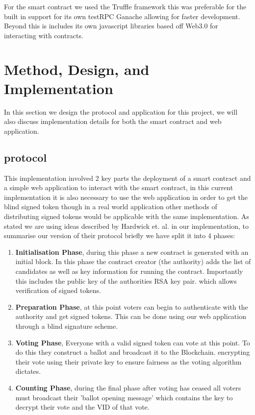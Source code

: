 \documentclass{entcs}
\begin{document}
For the smart contract we used the Truffle framework this was preferable for the built in support for its own testRPC Ganache allowing for faster development. Beyond this is includes its own javascript libraries based off Web3.0 for interacting with contracts.

\section{Method, Design, and Implementation}
In this section we design the protocol and application for this project, we will also discuss implementation details for both the smart contract and web application.

\subsection{protocol}
This implementation involved 2 key parts the deployment of a smart contract and a simple web application to interact with the smart contract, in this current implementation it is also necessary to use the web application in order to get the blind signed token though in a real world application other methods of distributing signed tokens would be applicable with the same implementation.
As stated we are using ideas described by Hardwick et. al. \cite{hardwick2018} in our implementation, to summarise our version of their protocol briefly we have split it into 4 phases:
\begin{enumerate}
    \item \textbf{Initialisation Phase}, during this phase a new contract is generated with an initial block. In this phase the contract creator (the authority) adds the list of candidates as well as key information for running the contract. Importantly this includes the public key of the authorities RSA key pair. which allows verification of signed tokens.
    \item \textbf{Preparation Phase}, at this point voters can begin to authenticate with the authority and get signed tokens. This can be done using our web application through a blind signature scheme.
    \item \textbf{Voting Phase}, Everyone with a valid signed token can vote at this point. To do this they construct a ballot and broadcast it to the Blockchain. encrypting their vote using their private key to ensure fairness as the voting algorithm dictates.
    \item \textbf{Counting Phase}, during the final phase after voting has ceased all voters must broadcast their 'ballot opening message' which contains the key to decrypt their vote and the VID of that vote.
\end{enumerate}
\end{document}
